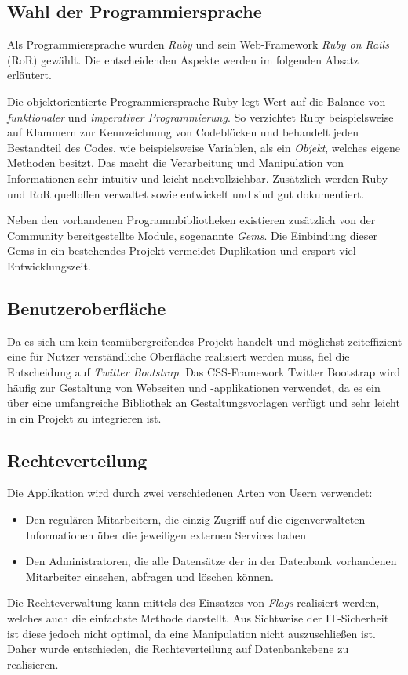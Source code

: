 
\subsection{Wahl der Programmiersprache}
\label{sec:Wahl der Programmiersprache}
Als Programmiersprache wurden \textit{Ruby} und sein Web-Framework \textit{Ruby on Rails} (RoR) gewählt.
Die entscheidenden Aspekte werden im folgenden Absatz erläutert.

Die objektorientierte Programmiersprache Ruby legt Wert auf die Balance von \textit{funktionaler} und
\textit{imperativer Programmierung}. So verzichtet Ruby beispielsweise auf Klammern zur Kennzeichnung
von Codeblöcken und behandelt jeden Bestandteil des Codes, wie beispielsweise Variablen, als ein \textit{Objekt},
welches eigene Methoden besitzt. Das macht die Verarbeitung und Manipulation von Informationen sehr
intuitiv und leicht nachvollziehbar. Zusätzlich werden Ruby und \acs{RoR}
quelloffen verwaltet sowie entwickelt und sind gut dokumentiert.

Neben den vorhandenen Programmbibliotheken existieren zusätzlich von der Community bereitgestellte Module,
sogenannte \textit{Gems}. Die Einbindung dieser Gems in ein bestehendes Projekt vermeidet
Duplikation und erspart viel Entwicklungszeit.

\subsection{Benutzeroberfläche}
\label{sec:Benutzeroberfläche}
Da es sich um kein teamübergreifendes Projekt handelt und möglichst zeiteffizient
eine für Nutzer verständliche Oberfläche realisiert werden muss, fiel die Entscheidung auf
\textit{Twitter Bootstrap}.
Das CSS-Framework Twitter Bootstrap wird häufig zur Gestaltung von Webseiten und
-applikationen verwendet, da es ein über eine umfangreiche Bibliothek an Gestaltungsvorlagen
verfügt und sehr leicht in ein Projekt zu integrieren ist.

\subsection{Rechteverteilung}
\label{sec:Rechteverteilung}
Die Applikation wird durch zwei verschiedenen Arten von Usern verwendet:
\begin{itemize}
	\item Den regulären Mitarbeitern, die einzig Zugriff auf die eigenverwalteten Informationen über die jeweiligen externen Services haben
	\item Den Administratoren, die alle Datensätze der in der Datenbank vorhandenen Mitarbeiter einsehen, abfragen und löschen können.
\end{itemize}
Die Rechteverwaltung kann mittels des Einsatzes von \textit{Flags} realisiert werden, welches auch
die einfachste Methode darstellt. Aus Sichtweise der IT-Sicherheit ist diese jedoch nicht optimal,
da eine Manipulation nicht auszuschließen ist. Daher wurde entschieden, die Rechteverteilung auf
Datenbankebene zu realisieren.

